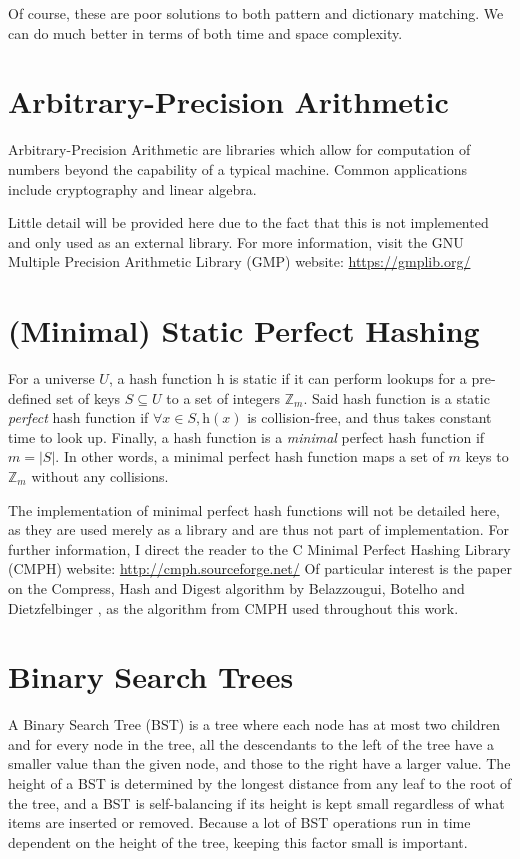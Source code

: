 \documentclass[ %
                    author={Dominic Joseph Moylett},
                    degree={MEng},
                     title={Dictionary Matching with Fingerprints},
                  subtitle={An Empirical Analysis},
                      type={research},
                      year={2015} ]{dissertation}
\begin{document}
Of course, these are poor solutions to both pattern and dictionary matching. We can do much better in terms of both time and space complexity.

\section{Arbitrary-Precision Arithmetic}

Arbitrary-Precision Arithmetic are libraries which allow for computation of numbers beyond the capability of a typical machine. Common applications include cryptography and linear algebra.

Little detail will be provided here due to the fact that this is not implemented and only used as an external library. For more information, visit the GNU Multiple Precision Arithmetic Library (GMP) website: \url{https://gmplib.org/}

\section{(Minimal) Static Perfect Hashing}
\label{min-perf-hash}

For a universe $U$, a hash function $\text{h}$ is static if it can perform lookups for a pre-defined set of keys $S \subseteq U$ to a set of integers $\mathbb{Z}_m$. Said hash function is a static \textit{perfect} hash function if $\forall x \in S, \text{h}(x)$ is collision-free, and thus takes constant time to look up. Finally, a hash function is a \textit{minimal} perfect hash function if $m = |S|$. In other words, a minimal perfect hash function maps a set of $m$ keys to $\mathbb{Z}_m$ without any collisions.

The implementation of minimal perfect hash functions will not be detailed here, as they are used merely as a library and are thus not part of implementation. For further information, I direct the reader to the C Minimal Perfect Hashing Library (CMPH) website: \url{http://cmph.sourceforge.net/} Of particular interest is the paper on the Compress, Hash and Digest algorithm by Belazzougui, Botelho and Dietzfelbinger \cite{belazzougui:chd}, as the algorithm from CMPH used throughout this work.

\section{Binary Search Trees}
A Binary Search Tree (BST) \cite{clrs:bst} is a tree where each node has at most two children and for every node in the tree, all the descendants to the left of the tree have a smaller value than the given node, and those to the right have a larger value. The height of a BST is determined by the longest distance from any leaf to the root of the tree, and a BST is self-balancing if its height is kept small regardless of what items are inserted or removed. Because a lot of BST operations run in time dependent on the height of the tree, keeping this factor small is important.
\end{document}
